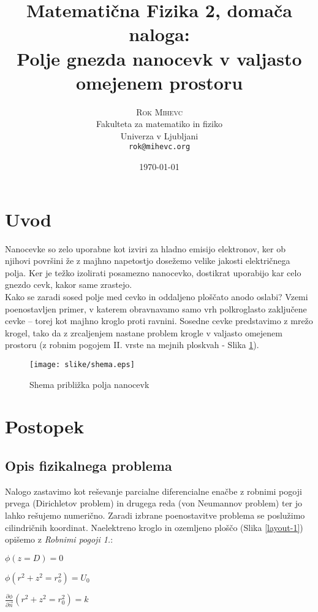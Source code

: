 \documentclass{article}[12pt]
\title{Matematična Fizika 2, domača naloga:\\
Polje gnezda nanocevk v valjasto omejenem prostoru}
\author{
     \textsc{Rok Mihevc} \\[0.25em]
     {\small{Fakulteta za matematiko in fiziko}} \\[-0.25em]
     {\small{Univerza v Ljubljani}} \\[-0.25em]
     {\small\texttt{rok@mihevc.org}}
     }
\date{\today}
\begin{document}
\maketitle


\section{Uvod}

Nanocevke so zelo uporabne kot izviri za hladno emisijo elektronov, ker ob njihovi površini že z majhno napetostjo dosežemo velike jakosti električnega polja. Ker je težko izolirati posamezno nanocevko, dostikrat uporabijo kar celo gnezdo cevk, kakor same zrastejo.\\
Kako se zaradi sosed polje med cevko in oddaljeno ploščato anodo oslabi? Vzemi poenostavljen primer, v katerem obravnavamo samo vrh polkroglasto zaključene cevke – torej kot majhno kroglo proti ravnini. Sosedne cevke predstavimo z mrežo krogel, tako da z zrcaljenjem nastane problem krogle v valjasto omejenem prostoru (z robnim pogojem II. vrste na mejnih ploskvah - Slika \ref{shema}).

\begin{figure}[h]
\begin{center}
\texttt{[image: slike/shema.eps]}
\caption{Shema približka polja nanocevk}
\label{shema}
\end{center}
\end{figure}

\section{Postopek}

\subsection{Opis fizikalnega problema}
Nalogo zastavimo kot reševanje parcialne diferencialne enačbe z robnimi pogoji prvega (Dirichletov problem) in
drugega reda (von Neumannov problem) ter jo lahko rešujemo numerično. Zaradi izbrane poenostavitve problema se 
poslužimo cilindričnih koordinat. \newpage
Naelektreno kroglo in ozemljeno ploščo (Slika \ref{layout-1}) opišemo z \textit{Robnimi pogoji 1.}:\newline

$ \phi (z = D) = 0 $

$ \phi (r^2 + z^2 = r_o^2) = U_0 $

$ \frac{\partial \phi}{\partial \vec{n}} (r^2 + z^2 = r_0^2) = k $
\newline
\end{document}

